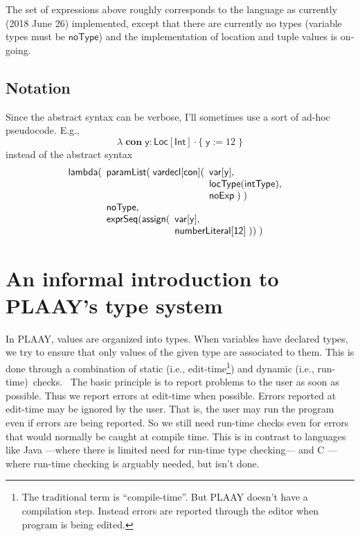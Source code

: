 \documentclass[12pt]{article}
\begin{document}
The set of expressions above roughly corresponds to the language as
currently (2018 June 26) implemented, except that there are currently no
types (variable types must be $\mathsf{noType}$) and the implementation of
location and tuple values is on-going.

\subsection{Notation}

Since the abstract syntax can be verbose, I'll sometimes use a sort of
ad-hoc pseudocode. E.g.,%
\begin{equation*}
\lambda \;\mathbf{con}\;\mathsf{y}:\mathsf{Loc}[\mathsf{Int}]\cdot \{\;%
\mathsf{y}:=12\;\}
\end{equation*}%
instead of the abstract syntax%
\begin{equation*}
\mathsf{lambda(}%
\begin{array}[t]{l}
\mathsf{paramList(\;vardecl[con](}%
\begin{array}[t]{l}
\mathsf{var[y],} \\ 
\mathsf{locType(intType),} \\ 
\mathsf{noExp\;)\;)}%
\end{array}
\\ 
\mathsf{noType,} \\ 
\mathsf{exprSeq(assign(}%
\begin{array}[t]{l}
\mathsf{var[y],} \\ 
\mathsf{numberLiteral[12]\;))\;)}%
\end{array}%
\end{array}%
\end{equation*}

\section{An informal introduction to PLAAY's type system}

In PLAAY, values are organized into types. When variables have declared
types, we try to ensure that only values of the given type are associated to
them. This is done through a combination of static (i.e., edit-time\footnote{%
The traditional term is \textquotedblleft compile-time\textquotedblright .
But PLAAY doesn't have a compilation step. Instead errors are reported
through the editor when program is being edited.}) and dynamic (i.e.,
run-time)\ checks. \ The basic principle is to report problems to the user
as soon as possible. Thus we report errors at edit-time when possible.
Errors reported at edit-time may be ignored by the user. That is, the user
may run the program even if errors are being reported. So we still need
run-time checks even for errors that would normally be caught at compile
time. This is in contrast to languages like Java ---where there is limited
need for run-time type checking--- and C ---where run-time checking is
arguably needed, but isn't done.
\end{document}

